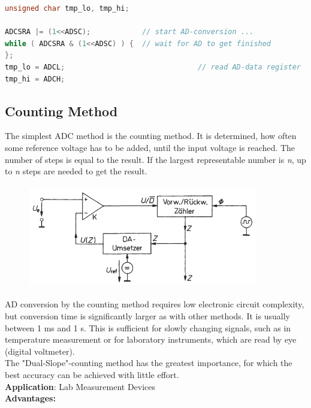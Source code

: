 \begin{lstlisting}[style=mystyle, language=c]
unsigned char tmp_lo, tmp_hi;

ADCSRA |= (1<<ADSC);            // start AD-conversion ...
while ( ADCSRA & (1<<ADSC) ) {  // wait for AD to get finished
};
tmp_lo = ADCL;  							 // read AD-data register
tmp_hi = ADCH;

\end{lstlisting}

\subsection{Counting Method}

The simplest ADC method is the counting method. It is determined, how often some  reference voltage has to be added, until the input voltage is reached. The number of steps is equal to the result. If the largest representable number is \textit{n}, up to \textit{n} steps are needed to get the result.

    \begin{figure}[h]
    \centering
    \includegraphics[width=10cm, height=4.5cm]{Images/image39.png}
    \label{fig:Fig 132}
    \end{figure}

AD conversion by the counting method requires low electronic circuit complexity, but conversion time is significantly larger as with other methods. It is usually between 1 ms and 1 s. This is sufficient for slowly changing signals, such as in temperature measurement or for laboratory instruments, which are read by eye (digital voltmeter). \\

The "Dual-Slope"-counting method has the greatest importance, for which the best accuracy can be achieved with little effort.\\

\textbf{Application}: Lab Measurement Devices\\

\textbf{Advantages:  }

